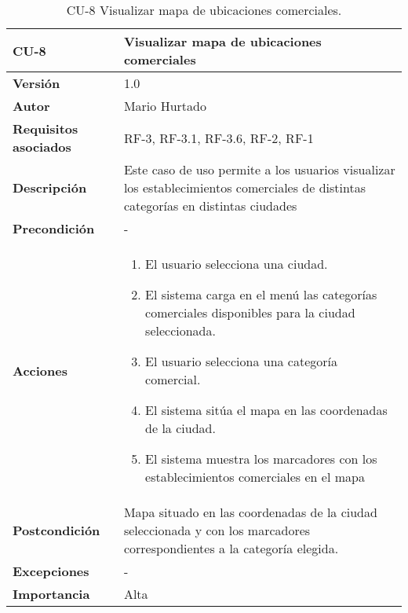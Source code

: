 \begin{table}[p]
	\centering
	\begin{tabularx}{\linewidth}{ p{} p{} }
			\toprule
			\textbf{CU-8}    & \textbf{Visualizar mapa de ubicaciones comerciales}\\
			\toprule
			\textbf{Versión}              & 1.0    \\
			\textbf{Autor}                & Mario Hurtado \\
			\textbf{Requisitos asociados} & RF-3, RF-3.1, RF-3.6, RF-2, RF-1 \\
			\textbf{Descripción}          & Este caso de uso permite a los usuarios visualizar los establecimientos comerciales de distintas categorías en distintas ciudades \\
			\textbf{Precondición}         & -\\
			\textbf{Acciones}             &
			\begin{enumerate}
					\def\labelenumi{\arabic{enumi}.}
					\tightlist
					\item El usuario selecciona una ciudad.
					\item El sistema carga en el menú las categorías comerciales disponibles para la ciudad seleccionada.
					\item El usuario selecciona una categoría comercial.
					\item El sistema sitúa el mapa en las coordenadas de la ciudad.
					\item El sistema muestra los marcadores con los establecimientos comerciales en el mapa
				\end{enumerate}\\
			\textbf{Postcondición}        & Mapa situado en las coordenadas de la ciudad seleccionada y con los marcadores correspondientes a la categoría elegida.\\
			\textbf{Excepciones}          & - \\
			\textbf{Importancia}          & Alta \\
			\bottomrule
		\end{tabularx}
	\caption{CU-8 Visualizar mapa de ubicaciones comerciales.}
\end{table}

